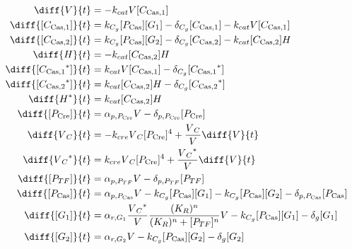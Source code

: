 \begin{align}
\diff{\vectorGen{}}{t} & = - \casCutRate{{}}\vectorGen{}\conc{\cplx{\cas}{1}}\\
\diff{\conc{\cplx{\cas}{1}}}{t} & =  \gRnaBind{}\conc{\proSp{\cas{}}}\conc{\gRna{1}} - \casCompDegradeRate{}\conc{\cplx{\cas}{1}} - \casCutRate{{}}\vectorGen{}\conc{\cplx{\cas}{1}}\\
\diff{\conc{\cplx{\cas}{2}}}{t} & =  \gRnaBind{}\conc{\proSp{\cas{}}}\conc{\gRna{2}} - \casCompDegradeRate{}\conc{\cplx{\cas}{2}} - \casCutRate{{}}\conc{\cplx{\cas}{2}}\hostGen{}\\
\diff{\hostGen{}}{t} & = - \casCutRate{{}}\conc{\cplx{\cas}{2}}\hostGen{}\\
\diff{\conc{\bound{\cplx{\cas}{1}}}}{t} & =  \casCutRate{{}}\vectorGen{}\conc{\cplx{\cas}{1}} - \casCompDegradeRate{}\conc{\bound{\cplx{\cas}{1}}}\\
\diff{\conc{\bound{\cplx{\cas}{2}}}}{t} & =  \casCutRate{{}}\conc{\cplx{\cas}{2}}\hostGen{} - \casCompDegradeRate{}\conc{\bound{\cplx{\cas}{2}}}\\
\diff{\edited{\hostGen{}}}{t} & =  \casCutRate{{}}\conc{\cplx{\cas}{2}}\hostGen{}\\
\diff{\conc{\proSp{\cre{}}}}{t} & =  \txtlRate{\proSp{\cre{}}}\vectorGen{} - \proDegradeRate{\proSp{\cre{}}}\conc{\proSp{\cre{}}}\\
\diff{\vectorGen{}_C}{t} & = - \creCutRate{} \vectorGen{}_C \conc{\proSp{\cre{}}}^4 + \frac{\vectorGen{}_C}{\vectorGen{}} \diff{\vectorGen{}}{t}\\
\diff{\edited{\vectorGen{}_C}}{t} & =  \creCutRate{} \vectorGen{}_C \conc{\proSp{\cre{}}}^4 + \frac{\edited{\vectorGen{}_C}}{\vectorGen{}} \diff{\vectorGen{}}{t}\\
\diff{\conc{\proSp{TF}}}{t} & =  \txtlRate{\proSp{TF}}\vectorGen{} - \proDegradeRate{\proSp{TF}}\conc{\proSp{TF}}\\
\diff{\conc{\proSp{\cas{}}}}{t} & =  \txtlRate{\proSp{\cas{}}}\vectorGen{} - \gRnaBind{}\conc{\proSp{\cas{}}}\conc{\gRna{1}} - \gRnaBind{}\conc{\proSp{\cas{}}}\conc{\gRna{2}} - \proDegradeRate{\proSp{\cas{}}}\conc{\proSp{\cas{}}}\\
\diff{\conc{\gRna{1}}}{t} & =  \txRate{\gRna{1}}\frac{\edited{\vectorGen{}_C}}{\vectorGen{}}\frac{(K_R)^n}{(K_R)^n + \conc{\proSp{TF}}^n}\vectorGen{} - \gRnaBind{}\conc{\proSp{\cas{}}}\conc{\gRna{1}} - \rnaDegradeRate{}\conc{\gRna{1}}\\
\diff{\conc{\gRna{2}}}{t} & =  \txRate{\gRna{2}}\vectorGen{} - \gRnaBind{}\conc{\proSp{\cas{}}}\conc{\gRna{2}} - \rnaDegradeRate{}\conc{\gRna{2}}
\end{align}


